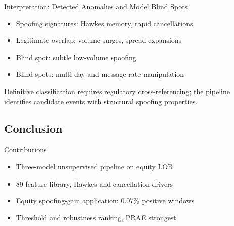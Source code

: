 \documentclass{beamer}
\begin{document}
\begin{frame}{Interpretation: Detected Anomalies and Model Blind Spots}
    \begin{itemize}
        \item Spoofing signatures: Hawkes memory, rapid cancellations
        \item Legitimate overlap: volume surges, spread expansions
        \item Blind spot: subtle low-volume spoofing
        \item Blind spots: multi-day and message-rate manipulation
    \end{itemize}
    \begin{tcolorbox}[keybox, title=]
        Definitive classification requires regulatory cross-referencing; the pipeline identifies candidate events with structural spoofing properties.
    \end{tcolorbox}
\end{frame}


\subsection{Conclusion}

\begin{frame}{Contributions}
    \begin{itemize}
        \item Three-model unsupervised pipeline on equity LOB
        \item 89-feature library, Hawkes and cancellation drivers
        \item Equity spoofing-gain application: 0.07\% positive windows
        \item Threshold and robustness ranking, PRAE strongest
    \end{itemize}
\end{frame}
\end{document}
